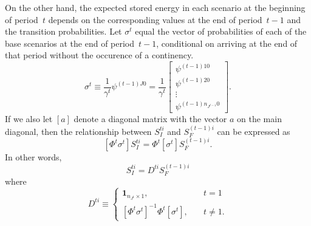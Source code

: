 \documentclass[12pt]{article}
\numberwithin{equation}{section}
\numberwithin{table}{section}
\numberwithin{figure}{section}
\begin{document}
On the other hand, the expected stored energy in each scenario at the beginning of period~$t$ depends on the corresponding values at the end of period~$t-1$ and the transition probabilities. Let $\sigma^t$ equal the vector of probabilities of each of the base scenarios at the end of period~$t-1$, conditional on arriving at the end of that period without the occurence of a continency.
\begin{equation}
\sigma^t \equiv \frac{1}{\gamma^t} \psi^{(t-1)J0} = \frac{1}{\gamma^t}
    \left[\begin{array}{c}
        \psi^{(t-1)10} \\
        \psi^{(t-1)20} \\
        \vdots \\
        \psi^{(t-1)n_{J^{t-1}}0}
    \end{array}\right].
\end{equation}
If we also let $[a]$ denote a diagonal matrix with the vector $a$ on the main diagonal, then the relationship between $S_I^{ti}$ and $S_F^{(t-1)i}$ can be expressed as
\begin{equation}
\left[ \Phi^t \sigma^t \right] S_I^{ti} = \Phi^t \left[ \sigma^t \right] S_F^{(t-1)i}.
\end{equation}
In other words,
\begin{equation}
S_I^{ti} = D^{ti} S_F^{(t-1)i} \label{eq:si}
\end{equation}
where
\begin{equation}
D^{ti} \equiv  \left\{
\begin{aligned}
\mathbf{1}_{n_{J^t} \times 1}, \quad & t = 1 \\
\left[ \Phi^t \sigma^t \right]^{-1} \Phi^t \left[ \sigma^t \right], \quad & t \ne 1.
\end{aligned}
\right.
\end{equation}
\end{document}
